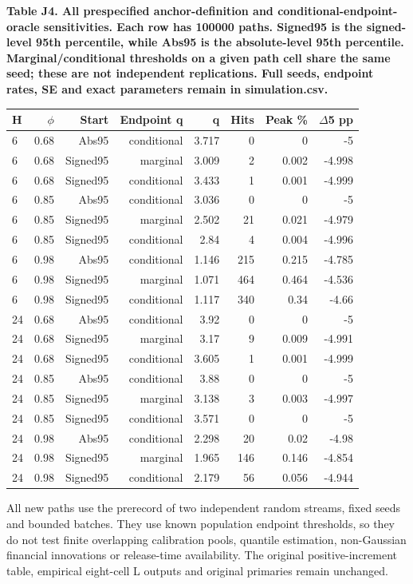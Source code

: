 \documentclass[10pt,a4paper]{article}
\begin{document}
\begin{center}
\begin{minipage}{\linewidth}
\small\textbf{Table J4. All prespecified anchor-definition and conditional-endpoint-oracle sensitivities. Each row has 100000 paths. Signed95 is the signed-level 95th percentile, while Abs95 is the absolute-level 95th percentile. Marginal/conditional thresholds on a given path cell share the same seed; these are not independent replications. Full seeds, endpoint rates, SE and exact parameters remain in simulation.csv.}\par\medskip
\centering\fontsize{8}{10}\selectfont
\begin{tabular}{lrrrrrrr}
\toprule
H & \(\phi\) & Start & Endpoint q & q & Hits & Peak \% & \(\Delta\)5 pp \\
\midrule
6 & 0.68 & Abs95 & conditional & 3.717 & 0 & 0 & -5 \\
6 & 0.68 & Signed95 & marginal & 3.009 & 2 & 0.002 & -4.998 \\
6 & 0.68 & Signed95 & conditional & 3.433 & 1 & 0.001 & -4.999 \\
6 & 0.85 & Abs95 & conditional & 3.036 & 0 & 0 & -5 \\
6 & 0.85 & Signed95 & marginal & 2.502 & 21 & 0.021 & -4.979 \\
6 & 0.85 & Signed95 & conditional & 2.84 & 4 & 0.004 & -4.996 \\
6 & 0.98 & Abs95 & conditional & 1.146 & 215 & 0.215 & -4.785 \\
6 & 0.98 & Signed95 & marginal & 1.071 & 464 & 0.464 & -4.536 \\
6 & 0.98 & Signed95 & conditional & 1.117 & 340 & 0.34 & -4.66 \\
24 & 0.68 & Abs95 & conditional & 3.92 & 0 & 0 & -5 \\
24 & 0.68 & Signed95 & marginal & 3.17 & 9 & 0.009 & -4.991 \\
24 & 0.68 & Signed95 & conditional & 3.605 & 1 & 0.001 & -4.999 \\
24 & 0.85 & Abs95 & conditional & 3.88 & 0 & 0 & -5 \\
24 & 0.85 & Signed95 & marginal & 3.138 & 3 & 0.003 & -4.997 \\
24 & 0.85 & Signed95 & conditional & 3.571 & 0 & 0 & -5 \\
24 & 0.98 & Abs95 & conditional & 2.298 & 20 & 0.02 & -4.98 \\
24 & 0.98 & Signed95 & marginal & 1.965 & 146 & 0.146 & -4.854 \\
24 & 0.98 & Signed95 & conditional & 2.179 & 56 & 0.056 & -4.944 \\
\bottomrule
\end{tabular}
\end{minipage}
\end{center}
All new paths use the prerecord of two independent random streams, fixed seeds and bounded batches. They use known population endpoint thresholds, so they do not test finite overlapping calibration pools, quantile estimation, non-Gaussian financial innovations or release-time availability. The original positive-increment table, empirical eight-cell L outputs and original primaries remain unchanged.
\end{document}
